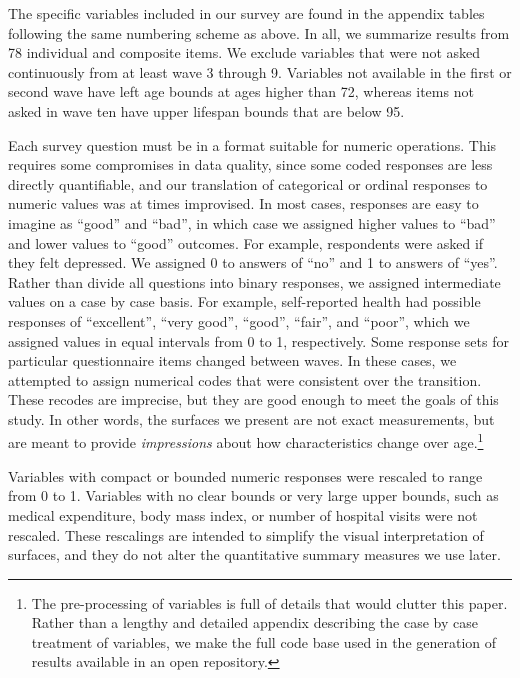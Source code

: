 \documentclass[11pt,oneside]{article} %
\begin{document}
The specific variables included in our survey are found in the appendix
tables following the same numbering scheme as above. In all, we summarize
results from 78 individual and composite items.
We exclude variables that were not asked continuously from at least wave 3 through 9. Variables not available in the
first or second wave have left age bounds at ages higher than 72, whereas items
not asked in wave ten have upper lifespan bounds that are below 95.

Each survey question must be in a format suitable for numeric operations.
This requires some compromises in data quality, since some coded responses are less directly
quantifiable, and our translation of categorical or ordinal responses to numeric
values was at times improvised. In most cases, responses are easy to imagine as
``good'' and ``bad'', in which case we assigned higher values to ``bad'' and
lower values to ``good'' outcomes. For example, respondents were asked if they
felt depressed. We assigned 0 to answers of ``no'' and 1 to answers of ``yes''.
Rather than divide all questions into binary responses, we assigned intermediate
values on a case by case basis. For example, self-reported health
had possible responses of ``excellent'', ``very good'', ``good'',
``fair'', and ``poor'', which we assigned values in equal intervals
from 0 to 1, respectively. Some response
sets for particular questionnaire items changed between
waves.
In these cases, we attempted to assign numerical codes that were consistent
over the transition. These recodes are imprecise, but they are good enough
to meet the goals of this study. In other words, the surfaces we
present are not exact measurements, but are meant to provide
\textit{impressions} about how characteristics change over age.\footnote{The
pre-processing of variables is full of details that would clutter this paper.
Rather than a lengthy and detailed appendix describing the case by case
treatment of variables, we make the full code base used in the generation of
results available in an open repository.}

Variables with compact or bounded numeric responses were rescaled to range from
0 to 1. Variables with no clear bounds or very large upper
bounds, such as medical expenditure, body mass index, or number of hospital
visits were not rescaled. These rescalings are intended to simplify
the visual interpretation of surfaces, and they do not alter the
quantitative summary measures we use later. 
\end{document}
